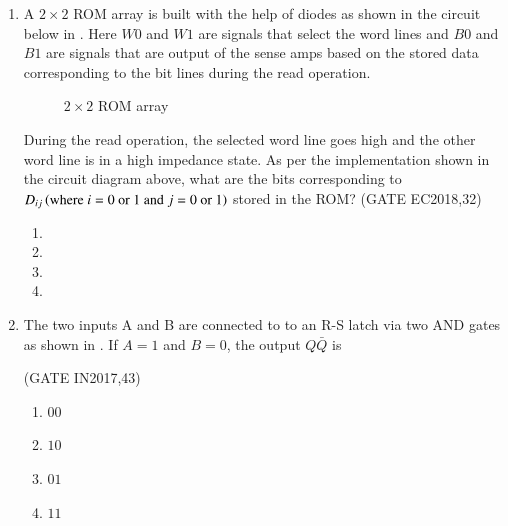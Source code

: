 \begin{enumerate}[label=\arabic*.,ref=\theenumi]
\item  A $2\times2$ ROM array is built with the help of diodes as shown in the circuit below
	in . Here $W0$ and $W1$ are signals that select the word lines and $B0$ and $B1$ are signals that are output of the sense amps based on the stored data corresponding to the bit lines during the read operation.
%
\begin{figure}[H]
        \centering
	\resizebox{\columnwidth}{!}{%
        
	}
        \caption{ $2\times 2$ ROM array}
	\label{fig:2rom}
\end{figure}
%
		During the read operation, the selected word line goes high and the other word line is in a high impedance state. As per the implementation shown in the circuit diagram above, what are the bits corresponding to $D_{ij}\left(\text{where $i=0$ or $1$ and $j=0$ or $1$}\right)$ stored in the ROM?
	\hfill(GATE EC2018,32)
\begin{enumerate}
    \item {}
    \item {}
    \item {}    
    \item {}
\end{enumerate}

\item The two inputs A and B are connected to to an R-S latch via two AND gates as shown in  
       .
If $A=1$ and $B=0$, the output $Q\bar{Q}$ is
    \begin{figure}[H]
        \centering
	\resizebox{\columnwidth}{!}{%
        
	    }
	    \caption{}
       \label{fig:GATE IN2017,43}
       \end{figure}
       \hfill(GATE IN2017,43)
    \begin{enumerate}
   		\item $00$ 
   		\item $10$ 
   		\item $01$ 
   		\item $11$ 
   

\end{enumerate}
\end{enumerate}
